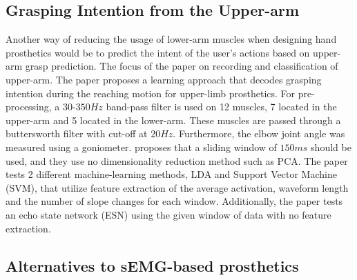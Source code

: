 \documentclass[../main.tex]{subfiles}
\begin{document}
\subsection{Grasping Intention from the Upper-arm}

Another way of reducing the usage of lower-arm muscles when designing hand prosthetics would be to predict the intent of the user's actions based on upper-arm grasp prediction.
The focus of the paper \cite{Batzianoulis2018} on recording and classification of upper-arm.
The paper proposes a learning approach that decodes grasping intention during the reaching motion for upper-limb prosthetics.
For pre-processing, a $30$-$350Hz$ band-pass filter is used on 12 muscles, 7 located in the upper-arm and 5 located in the lower-arm.
These muscles are passed through a buttersworth filter with cut-off at $20Hz$.
Furthermore, the elbow joint angle was measured using a goniometer.
\cite{Batzianoulis2018} proposes that a sliding window of $150ms$ should be used, and they use no dimensionality reduction method such as PCA.
The paper tests 2 different machine-learning methods, LDA and Support Vector Machine (SVM), that utilize feature extraction of the average activation, waveform length and the number of slope changes for each window.
Additionally, the paper tests an echo state network (ESN) using the given window of data with no feature extraction.

\subsection{Alternatives to sEMG-based prosthetics}
\end{document}
